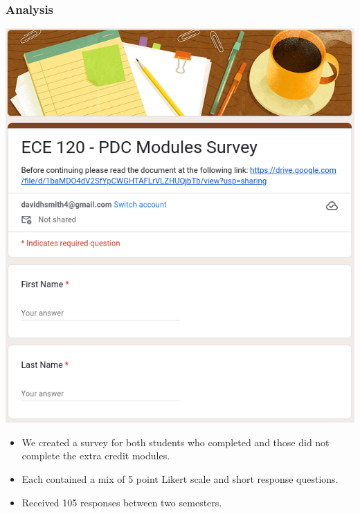 \documentclass{beamer}
\begin{document}
\begin{frame}
    \frametitle{Analysis}

    \begin{minipage}{0.45\textwidth}
      \includegraphics[width=\textwidth]{survey.png}
    \end{minipage}
    \begin{minipage}{0.54\textwidth}
      \begin{itemize}
        \item We created a survey for both students who completed and those did not complete the extra credit modules. 
        \item Each contained a mix of 5 point Likert scale and short response questions.
        \item Received 105 responses between two semesters.
      \end{itemize}
    \end{minipage}
    

\end{frame}
\end{document}
